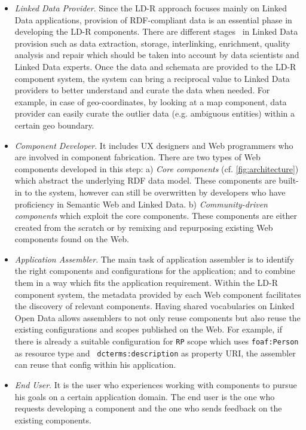 \documentclass{acm_proc_article-sp}
\begin{document}
\begin{itemize}

\item \emph{Linked Data Provider}.
Since the LD-R approach focuses mainly on Linked Data applications, provision of RDF-compliant data is an essential phase in developing the LD-R components.
There are different stages~\cite{AuerLOD2} in Linked Data provision such as data extraction, storage, interlinking, enrichment, quality analysis and repair which should be taken into account by data scientists and Linked Data experts.
Once the data and schemata are provided to the LD-R component system, the system can bring a reciprocal value to Linked Data providers to better understand and curate the data when needed.
For example, in case of geo-coordinates, by looking at a map component, data provider can easily curate the outlier data (e.g. ambiguous entities) within a certain geo boundary.

\item \emph{Component Developer}. 
It includes UX designers and Web programmers who are involved in component fabrication.
There are two types of Web components developed in this step:
a) \emph{Core components} (cf. \autoref{fig:architecture}) which abstract the underlying RDF data model.
These components are built-in to the system, however can still be overwritten by developers who have proficiency in Semantic Web and Linked Data.
b) \emph{Community-driven components} which exploit the core components.
These components are either created from the scratch or by remixing and repurposing existing Web components found on the Web.

\item \emph{Application Assembler}.
The main task of application assembler is to identify the right components and configurations for the application; and to combine them in a way which fits the application requirement. 
Within the LD-R component system, the metadata provided by each Web component facilitates the discovery of relevant components.
Having shared vocabularies on Linked Open Data allows assemblers to not only reuse components but also reuse the existing configurations and scopes published on the Web.
For example, if there is already a suitable configuration for \texttt{RP} scope which uses \texttt{foaf:Person} as resource type and ~\texttt{dcterms:description} as property URI, the assembler can reuse that config within his application.

\item \emph{End User}. 
It is the user who experiences working with components to pursue his goals on a certain application domain.
The end user is the one who requests developing a component and the one who sends feedback on the existing components.

\end{itemize}
\end{document}
